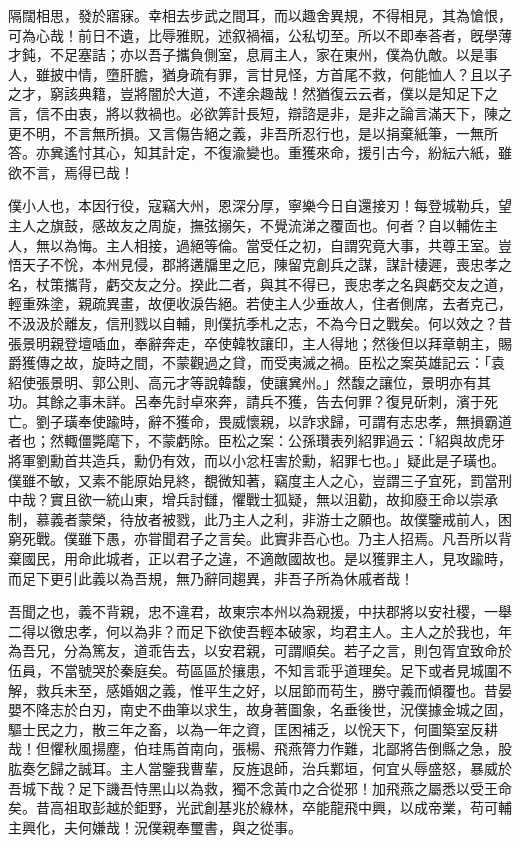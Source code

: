 \begin{pinyinscope}
隔闊相思，發於寤寐。幸相去步武之間耳，而以趣舍異規，不得相見，其為愴恨，可為心哉！前日不遺，比辱雅貺，述叙禍福，公私切至。所以不即奉荅者，旣學薄才鈍，不足塞詰；亦以吾子攜負側室，息肩主人，家在東州，僕為仇敵。以是事人，雖披中情，墮肝膽，猶身疏有罪，言甘見怪，方首尾不救，何能恤人？且以子之才，窮該典籍，豈將闇於大道，不達余趣哉！然猶復云云者，僕以是知足下之言，信不由衷，將以救禍也。必欲筭計長短，辯諮是非，是非之論言滿天下，陳之更不明，不言無所損。又言傷告絕之義，非吾所忍行也，是以捐棄紙筆，一無所答。亦兾遙忖其心，知其計定，不復渝變也。重獲來命，援引古今，紛紜六紙，雖欲不言，焉得已哉！

僕小人也，本因行役，寇竊大州，恩深分厚，寧樂今日自還接刃！每登城勒兵，望主人之旗鼓，感故友之周旋，撫弦搦矢，不覺流涕之覆靣也。何者？自以輔佐主人，無以為悔。主人相接，過絕等倫。當受任之初，自謂究竟大事，共尊王室。豈悟天子不恱，本州見侵，郡將遘牖里之厄，陳留克創兵之謀，謀計棲遲，喪忠孝之名，杖策攜背，虧交友之分。揆此二者，與其不得已，喪忠孝之名與虧交友之道，輕重殊塗，親疏異畫，故便收淚告絕。若使主人少垂故人，住者側席，去者克己，不汲汲於離友，信刑戮以自輔，則僕抗季札之志，不為今日之戰矣。何以效之？昔張景明親登壇喢血，奉辭奔走，卒使韓牧讓印，主人得地；然後但以拜章朝主，賜爵獲傳之故，旋時之間，不蒙觀過之貸，而受夷滅之禍。臣松之案英雄記云：「袁紹使張景明、郭公則、高元才等說韓馥，使讓兾州。」然馥之讓位，景明亦有其功。其餘之事未詳。呂奉先討卓來奔，請兵不獲，告去何罪？復見斫刺，濱于死亡。劉子璜奉使踰時，辭不獲命，畏威懷親，以詐求歸，可謂有志忠孝，無損霸道者也；然輙僵斃麾下，不蒙虧除。臣松之案：公孫瓚表列紹罪過云：「紹與故虎牙將軍劉勳首共造兵，勳仍有效，而以小忿枉害於勳，紹罪七也。」疑此是子璜也。僕雖不敏，又素不能原始見終，覩微知著，竊度主人之心，豈謂三子宜死，罰當刑中哉？實且欲一統山東，增兵討讎，懼戰士狐疑，無以沮勸，故抑廢王命以崇承制，慕義者蒙榮，待放者被戮，此乃主人之利，非游士之願也。故僕鑒戒前人，困窮死戰。僕雖下愚，亦甞聞君子之言矣。此實非吾心也。乃主人招焉。凡吾所以背棄國民，用命此城者，正以君子之違，不適敵國故也。是以獲罪主人，見攻踰時，而足下更引此義以為吾規，無乃辭同趨異，非吾子所為休戚者哉！

吾聞之也，義不背親，忠不違君，故東宗本州以為親援，中扶郡將以安社稷，一舉二得以徼忠孝，何以為非？而足下欲使吾輕本破家，均君主人。主人之於我也，年為吾兄，分為篤友，道乖告去，以安君親，可謂順矣。若子之言，則包胥宜致命於伍員，不當號哭於秦庭矣。苟區區於攘患，不知言乖乎道理矣。足下或者見城圍不解，救兵未至，感婚姻之義，惟平生之好，以屈節而苟生，勝守義而傾覆也。昔晏嬰不降志於白刃，南史不曲筆以求生，故身著圖象，名垂後世，況僕據金城之固，驅士民之力，散三年之畜，以為一年之資，匡困補乏，以恱天下，何圖築室反耕哉！但懼秋風揚塵，伯珪馬首南向，張楊、飛燕膂力作難，北鄙將告倒縣之急，股肱奏乞歸之誠耳。主人當鑒我曹輩，反旌退師，治兵鄴垣，何宜乆辱盛怒，暴威於吾城下哉？足下譏吾恃黑山以為救，獨不念黃巾之合從邪！加飛燕之屬悉以受王命矣。昔高祖取彭越於鉅野，光武創基兆於綠林，卒能龍飛中興，以成帝業，苟可輔主興化，夫何嫌哉！況僕親奉璽書，與之從事。


\end{pinyinscope}
